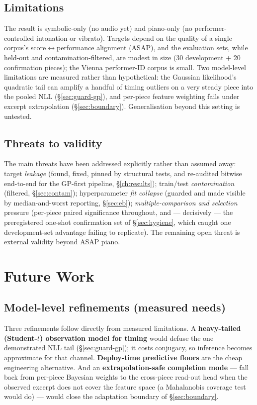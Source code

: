 \documentclass[11pt,a4paper]{report}
\begin{document}
\section{Limitations}
The result is symbolic-only (no audio yet) and piano-only (no performer-controlled
intonation or vibrato). Targets depend on the quality of a single corpus's
score$\leftrightarrow$performance alignment (ASAP), and the evaluation sets, while
held-out and contamination-filtered, are modest in size (30 development + 20
confirmation pieces); the Vienna performer-ID corpus is small. Two model-level
limitations are measured rather than hypothetical: the Gaussian likelihood's
quadratic tail can amplify a handful of timing outliers on a very steady piece into
the pooled NLL (\S\ref{sec:guard-gp}), and per-piece feature weighting fails under
excerpt extrapolation (\S\ref{sec:boundary}). Generalisation beyond this setting is
untested.

\section{Threats to validity}
The main threats have been addressed explicitly rather than assumed away: target
\emph{leakage} (found, fixed, pinned by structural tests, and re-audited bitwise
end-to-end for the GP-first pipeline, \S\ref{ch:results}); train/test
\emph{contamination} (filtered, \S\ref{sec:contam}); hyperparameter \emph{fit
collapse} (guarded and made visible by median-and-worst reporting,
\S\ref{sec:eb}); \emph{multiple-comparison and selection} pressure (per-piece
paired significance throughout, and --- decisively --- the preregistered one-shot
confirmation set of \S\ref{sec:hygiene}, which caught one development-set advantage
failing to replicate). The remaining open threat is external validity beyond ASAP
piano.

\chapter{Future Work}\label{ch:future}

\section{Model-level refinements (measured needs)}
Three refinements follow directly from measured limitations. A
\textbf{heavy-tailed (Student-$t$) observation model for timing} would defuse the
one demonstrated NLL tail (\S\ref{sec:guard-gp}); it costs conjugacy, so inference
becomes approximate for that channel. \textbf{Deploy-time predictive floors} are the
cheap engineering alternative. And an \textbf{extrapolation-safe completion mode}
--- fall back from per-piece Bayesian weights to the cross-piece read-out head when
the observed excerpt does not cover the feature space (a Mahalanobis coverage test
would do) --- would close the adaptation boundary of \S\ref{sec:boundary}.
\end{document}
